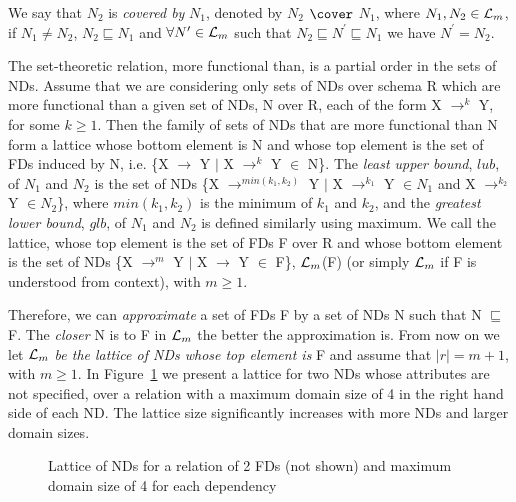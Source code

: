 \begin{definition}[Covered By]\label{def:covered}
\begin{rm}
We say that $N_2$ is {\em covered by} $N_1$, denoted by $N_2$ $\cover$ $N_1$, where $N_1, N_2 \in {\cal L}_m$, 
if $N_1 \not= N_2$, $N_2 \sqsubseteq N_1$ and
$\forall N^\prime \in {\cal L}_m$ such that 
$N_2 \sqsubseteq N^\prime \sqsubseteq N_1$ we have $N^\prime = N_2$.
\end{rm}
\end{definition}

The set-theoretic relation, more functional than, 
is a partial order in the sets of NDs.
Assume that we are considering only sets of NDs over schema R which are more functional 
than a given set of NDs, N over R, each of the form X $\to^k$ Y, 
for some $k \ge 1$.
Then the family of sets of NDs that are more functional than N form a lattice
whose bottom element is N and whose top element is the set of FDs
induced by N, i.e. \{X $\to$ Y $\mid$ X $\to^k$ Y $\in$ N\}.
The {\em least upper bound}, $lub$, of $N_1$ and $N_2$ is the set of NDs
\{X $\to^{min(k_1, k_2)}$ Y $\mid$
X $\to^{k_1}$ Y $\in N_1$ and X $\to^{k_2}$ Y $\in N_2$\},
where $min(k_1, k_2)$ is the minimum of $k_1$ and $k_2$, and the 
{\em greatest lower bound}, $glb$, of $N_1$ and $N_2$ is defined similarly using maximum.
We call the lattice, whose top element is the set of FDs F over R
and whose bottom element is the set of NDs
\{X $\to^m$ Y $\mid$ X $\to$ Y $\in$ F\}, ${\cal L}_m$(F)
(or simply ${\cal L}_m$ if F is understood from context), with $m \ge 1$.


Therefore, we can {\em approximate} a set of FDs F by a set of NDs N
such that N $\sqsubseteq$ F. 
The {\em closer} N is to F in ${\cal L}_m$ the better the approximation is.
From now on we let ${\cal L}_m$ 
{\em be the lattice of NDs whose top element is} F
and assume that $\mid r \mid = m+1$, with $m \ge 1$. In
Figure~\ref{latt:1} we present a lattice for two NDs whose attributes
are not specified, over a relation with a maximum domain size of 4 in
the right hand side of each ND. The lattice size significantly increases
with more NDs and larger domain sizes.


\begin{figure}[ht]
\centerline{}
\caption{\label{latt:1}Lattice of NDs for a relation of 2 FDs
(not shown) and maximum domain size of 4 for each dependency}
\end{figure}



